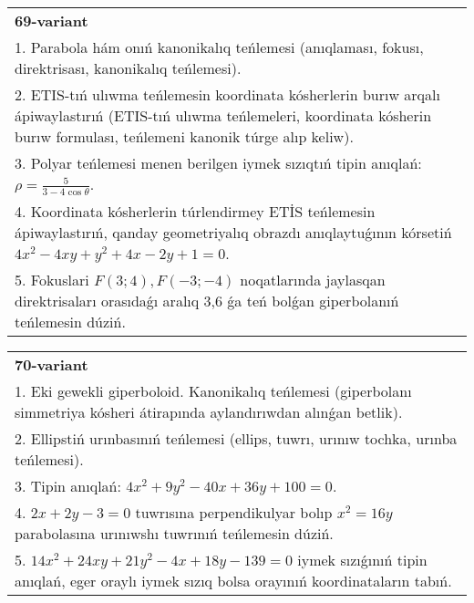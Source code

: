 \documentclass{article}
\begin{document}
\begin{tabular}{m{17cm}}
\textbf{69-variant}\\
1. Parabola hám onıń kanonikalıq teńlemesi (anıqlaması, fokusı, direktrisası, kanonikalıq teńlemesi).\\

2. ETIS-tıń ulıwma teńlemesin koordinata kósherlerin burıw arqalı ápiwaylastırıń (ETIS-tıń ulıwma teńlemeleri, koordinata kósherin burıw formulası, teńlemeni kanonik túrge alıp keliw).\\

3. Polyar teńlemesi menen berilgen iymek sızıqtıń tipin anıqlań: $\rho=\frac{5}{3-4\cos\theta}$.\\

4. Koordinata kósherlerin túrlendirmey ETİS teńlemesin ápiwaylastırıń, qanday geometriyalıq obrazdı anıqlaytuǵının kórsetiń $4x^{2} - 4xy + y^{2} + 4x - 2y + 1 = 0$.  \\

5. Fokuslari $F(3;4), F(-3;-4)$ noqatlarında jaylasqan direktrisaları orasıdaǵı aralıq 3,6 ǵa teń bolǵan giperbolanıń teńlemesin dúziń.  
\end{tabular}
\vspace{1cm}


\begin{tabular}{m{17cm}}
\textbf{70-variant}\\
1. Eki gewekli giperboloid. Kanonikalıq teńlemesi (giperbolanı simmetriya kósheri átirapında aylandırıwdan alınǵan betlik).\\

2. Ellipstiń urınbasınıń teńlemesi (ellips, tuwrı, urınıw tochka, urınba teńlemesi).\\

3. Tipin anıqlań: $4 x^2+9 y^2-40 x+36 y+100=0$.\\

4. $2x + 2y - 3 = 0$ tuwrısına perpendikulyar bolıp $x^{2} = 16y$ parabolasına urınıwshı tuwrınıń teńlemesin dúziń.  \\

5. $14x^{2} + 24xy + 21y^{2} - 4x + 18y - 139 = 0$ iymek sızıǵınıń tipin anıqlań, eger oraylı iymek sızıq bolsa orayınıń koordinataların tabıń.  
\end{tabular}
\vspace{1cm}
\end{document}
